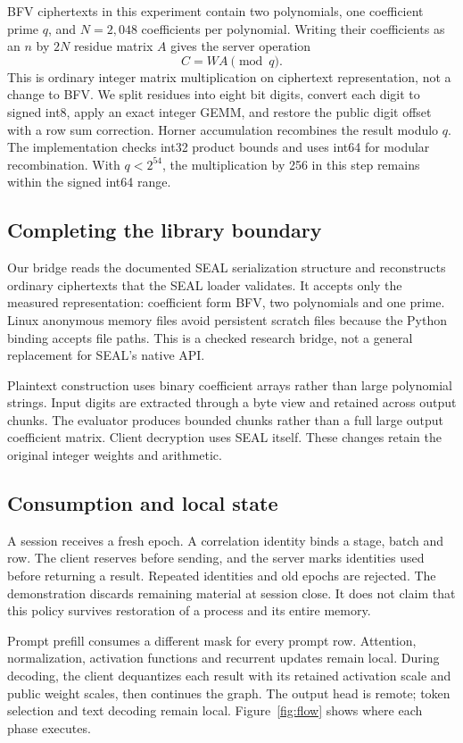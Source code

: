 \documentclass[10pt,twocolumn]{article}
\begin{document}
BFV ciphertexts in this experiment contain two polynomials, one coefficient
prime $q$, and $N=2,048$ coefficients per polynomial. Writing their coefficients
as an $n$ by $2N$ residue matrix $A$ gives the server operation
\begin{equation}
 C=WA\pmod q.
\end{equation}
This is ordinary integer matrix multiplication on ciphertext representation,
not a change to BFV. We split residues into eight bit digits, convert each digit
to signed int8, apply an exact integer GEMM, and restore the public digit offset
with a row sum correction. Horner accumulation recombines the result modulo
$q$. The implementation checks int32 product bounds and uses int64 for modular
recombination. With $q<2^{54}$, the multiplication by 256 in this step remains
within the signed int64 range.

\subsection{Completing the library boundary}
Our bridge reads the documented SEAL serialization structure and reconstructs
ordinary ciphertexts that the SEAL loader validates. It accepts only the
measured representation: coefficient form BFV, two polynomials and one prime.
Linux anonymous memory files avoid persistent scratch files because the Python
binding accepts file paths. This is a checked research bridge, not a general
replacement for SEAL's native API.

Plaintext construction uses binary coefficient arrays rather than large
polynomial strings. Input digits are extracted through a byte view and retained
across output chunks. The evaluator produces bounded chunks rather than a full
large output coefficient matrix. Client decryption uses SEAL itself. These
changes retain the original integer weights and arithmetic.

\subsection{Consumption and local state}
A session receives a fresh epoch. A correlation identity binds a stage, batch
and row. The client reserves before sending, and the server marks identities
used before returning a result. Repeated identities and old epochs are rejected.
The demonstration discards remaining material at session close. It does not
claim that this policy survives restoration of a process and its entire memory.

Prompt prefill consumes a different mask for every prompt row. Attention,
normalization, activation functions and recurrent updates remain local. During
decoding, the client dequantizes each result with its retained activation scale
and public weight scales, then continues the graph. The output head is remote;
token selection and text decoding remain local. Figure~\ref{fig:flow} shows
where each phase executes.
\end{document}
